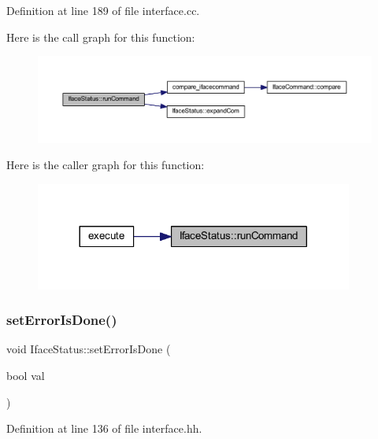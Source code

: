 Definition at line 189 of file interface.\+cc.

Here is the call graph for this function\+:
\nopagebreak
\begin{figure}[H]
\begin{center}
\leavevmode
\includegraphics[width=350pt]{class_iface_status_a78057db3e8cbf3c50cd1a6e4312892e5_cgraph}
\end{center}
\end{figure}
Here is the caller graph for this function\+:
\nopagebreak
\begin{figure}[H]
\begin{center}
\leavevmode
\includegraphics[width=296pt]{class_iface_status_a78057db3e8cbf3c50cd1a6e4312892e5_icgraph}
\end{center}
\end{figure}
\mbox{\label{class_iface_status_a3a987afd43c6bdaaeea9114b5d53129b}} 
\subsubsection{\texorpdfstring{setErrorIsDone()}{setErrorIsDone()}}
{\footnotesize\ttfamily void Iface\+Status\+::set\+Error\+Is\+Done (\begin{DoxyParamCaption}\item[{bool}]{val }\end{DoxyParamCaption})\hspace{0.3cm}{\ttfamily [inline]}}



Definition at line 136 of file interface.\+hh.

\mbox{\label{class_iface_status_aacefbcd5c2cf3fddd11051682b614854}} 
